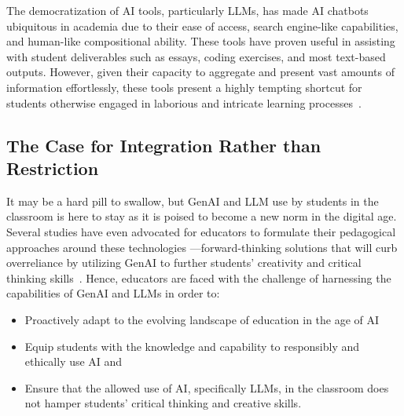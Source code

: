 \documentclass[sigconf,natbib=true]{acmart}
\begin{document}
The democratization of AI tools, particularly LLMs, has made AI chatbots ubiquitous in academia due to their ease of access, search engine-like capabilities, and human-like compositional ability. These tools have proven useful in assisting with student deliverables such as essays, coding exercises, and most text-based outputs. However, given their capacity to aggregate and present vast amounts of information effortlessly, these tools present a highly tempting shortcut for students otherwise engaged in laborious and intricate learning processes~\cite{parkPromisePerilChatGPT2024}.

\subsection{The Case for Integration Rather than Restriction}
It may be a hard pill to swallow, but GenAI and LLM use by students in the classroom is here to stay as it is poised to become a new norm in the digital age. Several studies have even advocated for educators to formulate their pedagogical approaches around these technologies —forward-thinking solutions that will curb overreliance by utilizing GenAI to further students' creativity and critical thinking skills~\cite{parkPromisePerilChatGPT2024,girayUseImpactChatGPT2024,espartinezExploringStudentTeacher2024}. Hence, educators are faced with the challenge of harnessing the capabilities of GenAI and LLMs in order to:

\begin{itemize}
  \item Proactively adapt to the evolving landscape of education in the age of AI\;
  \item Equip students with the knowledge and capability to responsibly and ethically use AI\; and
  \item Ensure that the allowed use of AI, specifically LLMs, in the classroom does not hamper students' critical thinking and creative skills.
\end{itemize}
\end{document}
